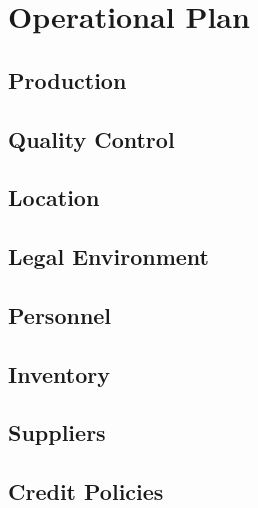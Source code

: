 \section{Operational Plan}
\subsection{Production}
\subsection{Quality Control}
\subsection{Location}
\subsection{Legal Environment}
\subsection{Personnel}
\subsection{Inventory}
\subsection{Suppliers}
\subsection{Credit Policies}
